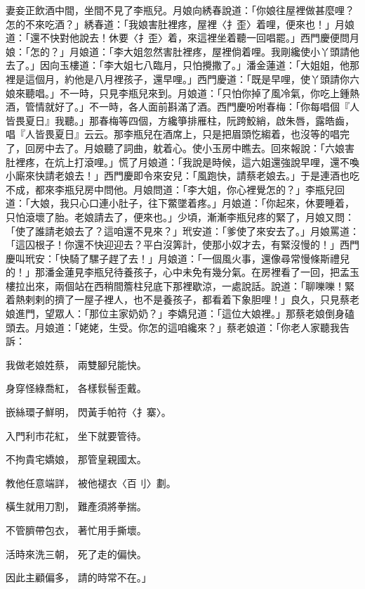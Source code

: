 妻妾正飲酒中間，坐間不見了李瓶兒。月娘向綉春說道：「你娘往屋裡做甚麼哩？怎的不來吃酒？」綉春道：「我娘害肚裡疼，屋裡〈扌歪〉着哩，便來也！」月娘道：「還不快對他說去！休要〈扌歪〉着，來這裡坐着聽一回唱罷。」西門慶便問月娘：「怎的？」月娘道：「李大姐忽然害肚裡疼，屋裡倘着哩。我剛纔使小丫頭請他去了。」因向玉樓道：「李大姐七八臨月，只怕攪撒了。」潘金蓮道：「大姐姐，他那裡是這個月，約他是八月裡孩子，還早哩。」西門慶道：「既是早哩，使丫頭請你六娘來聽唱。」不一時，只見李瓶兒來到。月娘道：「只怕你掉了風冷氣，你吃上鍾熱酒，管情就好了。」不一時，各人面前斟滿了酒。西門慶吩咐春梅：「你每唱個『人皆畏夏日』我聽。」那春梅等四個，方纔箏排雁柱，阮跨鮫綃，啟朱唇，露皓齒，唱『人皆畏夏日』云云。那李瓶兒在酒席上，只是把眉頭忔縐着，也沒等的唱完了，回房中去了。月娘聽了詞曲，躭着心。使小玉房中瞧去。回來報說：「六娘害肚裡疼，在炕上打滾哩。」慌了月娘道：「我說是時候，這六姐還強說早哩，還不喚小廝來快請老娘去！」西門慶即令來安兒：「風跑快，請蔡老娘去。」于是連酒也吃不成，都來李瓶兒房中問他。月娘問道：「李大姐，你心裡覺怎的？」李瓶兒回道：「大娘，我只心口連小肚子，往下鱉墜着疼。」月娘道：「你起來，休要睡着，只怕滾壞了胎。老娘請去了，便來也。」少頃，漸漸李瓶兒疼的緊了，月娘又問：「使了誰請老娘去了？這咱還不見來？」玳安道：「爹使了來安去了。」月娘罵道：「這囚根子！你還不快迎迎去？平白沒筭計，使那小奴才去，有緊沒慢的！」西門慶叫玳安：「快騎了騾子趕了去！」月娘道：「一個風火事，還像尋常慢條斯禮兒的！」那潘金蓮見李瓶兒待養孩子，心中未免有幾分氣。在房裡看了一回，把孟玉樓拉出來，兩個站在西稍間簷柱兒底下那裡歇涼，一處說話。說道：「聊嚛嚛！緊着熱剌剌的擠了一屋子裡人，也不是養孩子，都看着下象胆哩！」良久，只見蔡老娘進門，望眾人：「那位主家奶奶？」李嬌兒道：「這位大娘裡。」那蔡老娘倒身磕頭去。月娘道：「姥姥，生受。你怎的這咱纔來？」蔡老娘道：「你老人家聽我告訴：

我做老娘姓蔡，  兩雙腳兒能快。

身穿怪綠喬紅，  各樣䯼髻歪戴。

嵌絲環子鮮明，  閃黃手帕符〈扌寨〉。

入門利市花紅，  坐下就要管待。

不拘貴宅嬌娘，  那管皇親國太。

教他任意端詳，  被他褪衣〈百刂〉劃。

橫生就用刀割，  難產須將拳揣。

不管臍帶包衣，  著忙用手撕壞。

活時來洗三朝，  死了走的偏快。

因此主顧偏多，  請的時常不在。」

